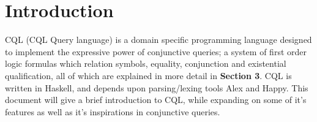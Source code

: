 \section{Introduction}
CQL (CQL Query language) is a domain specific programming language designed to implement the expressive power of conjunctive queries; a system of first order logic formulas which relation symbols, equality, conjunction and existential qualification, all of which are explained in more detail in \textbf{Section 3}. CQL is written in Haskell, and depends upon parsing/lexing tools Alex and Happy. This document will give a brief introduction to CQL, while expanding on some of it's features as well as it's inspirations in conjunctive queries.